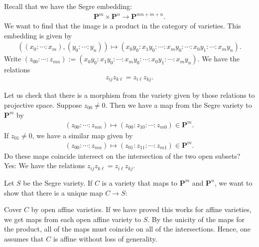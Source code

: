 \documentclass [11 pt, oneside] {article}
\begin{document}
Recall that we have the Segre embedding:
\begin{align*}
	\mathbf{P}^m\times \mathbf{P}^n\longrightarrow \mathbf{P}^{mn+m+n}.
\end{align*}
We want to find that the image is a product in the category of varieties. This embedding is given by
\begin{align*}
	((x_0:\cdots:x_m), (y_0:\cdots:y_n))\longmapsto (x_0y_0:x_1y_0:\cdots:x_my_0:\cdots: x_0y_1:\cdots:x_my_n).
\end{align*}
Write $(z_{00}:\cdots:z_{mn}):=(x_0y_0:x_1y_0:\cdots:x_my_0:\cdots: x_0y_1:\cdots:x_my_n)$. We have the relations
\begin{align*}
	z_{ij}z_{k\ell} = z_{i\ell}z_{kj}.
\end{align*}

Let us check that there is a morphism from the variety given by those relations to projective space. Suppose $z_{00}\ne 0$. Then we have a map from the Segre variety to $\mathbf{P}^m$ by
\begin{align*}
(z_{00}:\cdots:z_{mn})\longmapsto (z_{00}:z_{10}:\cdots:z_{m0})\in \mathbf{P}^m.	
\end{align*}
If $z_{01}\ne 0$, we have a similar map given by
\begin{align*}
	(z_{00}:\cdots:z_{mn})\longmapsto (z_{01}:z_{11}:\cdots:z_{m1})\in \mathbf{P}^m.
\end{align*}
Do these maps coincide intersect on the intersection of the two open subsets? Yes: We have the relations $z_{ij}z_{k\ell} = z_{i\ell}z_{kj}$. 

Let $S$ be the Segre variety. If $C$ is a variety that maps to $\mathbf{P}^m$ and $\mathbf{P}^n$, we want to show that there is a unique map $C\longrightarrow S$:
\begin{center}
\end{center}
Cover $C$ by open affine varieties. If we have proved this works for affine varieties, we get maps from each open affine variety to $S$. By the unicity of the maps for the product, all of the maps must coincide on all of the intersections. Hence, one assumes that $C$ is affine without loss of generality.
\end{document}
